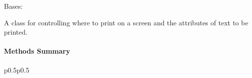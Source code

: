 \documentclass[a4paper,10pt,english]{sphinxmanual}
\begin{document}
\begin{fulllineitems}
\label{\detokenize{api/termtools.terminal.TerminalController:termtools.terminal.TerminalController}}
Bases: 

A class for controlling where to print on a screen and the attributes of text to be printed.
\paragraph{Methods Summary}


\begin{savenotes}\sphinxatlongtablestart\begin{longtable}{p{0.5\linewidth}p{0.5\linewidth}}
\hline

\endfirsthead

%
{}\\
\hline

\endhead

\hline
{}\\
\endfoot

\endlastfoot


\end{longtable}
\end{savenotes}
\end{fulllineitems}
\end{document}

